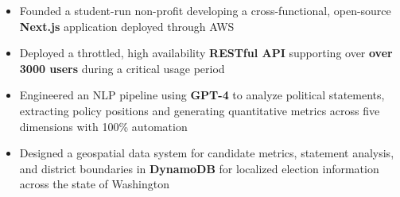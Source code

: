 \begin{itemize}
    \item Founded a student-run non-profit developing a cross-functional, open-source \textbf{Next.js} application deployed through AWS
    \item Deployed a throttled, high availability \textbf{RESTful API} supporting over \textbf{over 3000 users} during a critical usage period
    \item Engineered an NLP pipeline using \textbf{GPT-4} to analyze political statements, extracting policy positions and generating quantitative metrics across five dimensions with 100\% automation
    \item Designed a geospatial data system for candidate metrics, statement analysis, and district boundaries in \textbf{DynamoDB} for localized election information across the state of Washington
\end{itemize}